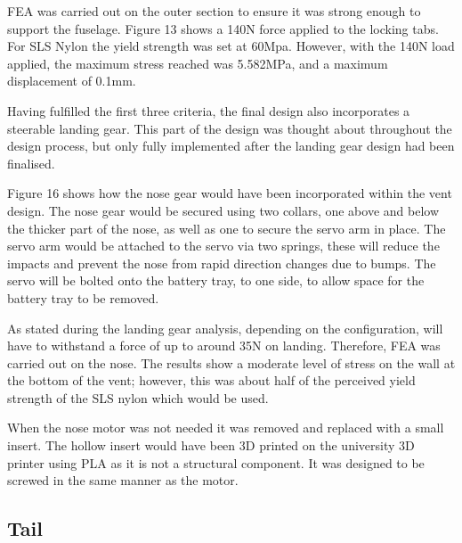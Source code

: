 \documentclass[../../main.tex]{subfiles}
\begin{document}

FEA was carried out on the outer section to ensure it was strong enough to support the fuselage.
Figure 13 shows a 140N force applied to the locking tabs.
For SLS Nylon the yield strength was set at 60Mpa.
However, with the 140N load applied, the maximum stress reached was 5.582MPa, and a maximum displacement of 0.1mm. 

Having fulfilled the first three criteria, the final design also incorporates a steerable landing gear.
This part of the design was thought about throughout the design process, but only fully implemented after the landing gear design had been finalised. 


Figure 16 shows how the nose gear would have been incorporated within the vent design.
The nose gear would be secured using two collars, one above and below the thicker part of the nose, as well as one to secure the servo arm in place.
The servo arm would be attached to the servo via two springs, these will reduce the impacts and prevent the nose from rapid direction changes due to bumps.
The servo will be bolted onto the battery tray, to one side, to allow space for the battery tray to be removed. 

As stated during the landing gear analysis, depending on the configuration, will have to withstand a force of up to around 35N on landing.
Therefore, FEA was carried out on the nose.
The results show a moderate level of stress on the wall at the bottom of the vent; however, this was about half of the perceived yield strength of the SLS nylon which would be used. 


When the nose motor was not needed it was removed and replaced with a small insert.
The hollow insert would have been 3D printed on the university 3D printer using PLA as it is not a structural component.
It was designed to be screwed in the same manner as the motor. 


\subsection{Tail} \label{sec:design-process:final-design-proposal:tail}
\end{document}
